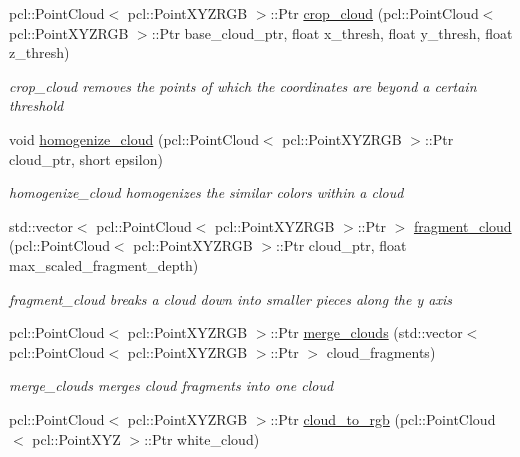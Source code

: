 \begin{DoxyCompactItemize}
pcl\+::\+Point\+Cloud$<$ pcl\+::\+Point\+X\+Y\+Z\+R\+GB $>$\+::Ptr \hyperlink{namespacecloud__object__segmentation_1_1cloud__manip_ad478d5ab331172d7cee927b4512c41e3}{crop\+\_\+cloud} (pcl\+::\+Point\+Cloud$<$ pcl\+::\+Point\+X\+Y\+Z\+R\+GB $>$\+::Ptr base\+\_\+cloud\+\_\+ptr, float x\+\_\+thresh, float y\+\_\+thresh, float z\+\_\+thresh)
\begin{DoxyCompactList}\small\item\em crop\+\_\+cloud removes the points of which the coordinates are beyond a certain threshold \end{DoxyCompactList}\item 
void \hyperlink{namespacecloud__object__segmentation_1_1cloud__manip_a27a363b92fc0623771f616e63355f53e}{homogenize\+\_\+cloud} (pcl\+::\+Point\+Cloud$<$ pcl\+::\+Point\+X\+Y\+Z\+R\+GB $>$\+::Ptr cloud\+\_\+ptr, short epsilon)
\begin{DoxyCompactList}\small\item\em homogenize\+\_\+cloud homogenizes the similar colors within a cloud \end{DoxyCompactList}\item 
std\+::vector$<$ pcl\+::\+Point\+Cloud$<$ pcl\+::\+Point\+X\+Y\+Z\+R\+GB $>$\+::Ptr $>$ \hyperlink{namespacecloud__object__segmentation_1_1cloud__manip_ad66f43b7fb1e5512f948ad68fa1a62aa}{fragment\+\_\+cloud} (pcl\+::\+Point\+Cloud$<$ pcl\+::\+Point\+X\+Y\+Z\+R\+GB $>$\+::Ptr cloud\+\_\+ptr, float max\+\_\+scaled\+\_\+fragment\+\_\+depth)
\begin{DoxyCompactList}\small\item\em fragment\+\_\+cloud breaks a cloud down into smaller pieces along the y axis \end{DoxyCompactList}\item 
pcl\+::\+Point\+Cloud$<$ pcl\+::\+Point\+X\+Y\+Z\+R\+GB $>$\+::Ptr \hyperlink{namespacecloud__object__segmentation_1_1cloud__manip_a511ee636ce50f2dc7a171fd02177034d}{merge\+\_\+clouds} (std\+::vector$<$ pcl\+::\+Point\+Cloud$<$ pcl\+::\+Point\+X\+Y\+Z\+R\+GB $>$\+::Ptr $>$ cloud\+\_\+fragments)
\begin{DoxyCompactList}\small\item\em merge\+\_\+clouds merges cloud fragments into one cloud \end{DoxyCompactList}\item 
pcl\+::\+Point\+Cloud$<$ pcl\+::\+Point\+X\+Y\+Z\+R\+GB $>$\+::Ptr \hyperlink{namespacecloud__object__segmentation_1_1cloud__manip_a60479bf28af2ec5244f6652973cde988}{cloud\+\_\+to\+\_\+rgb} (pcl\+::\+Point\+Cloud$<$ pcl\+::\+Point\+X\+YZ $>$\+::Ptr white\+\_\+cloud)

\end{DoxyCompactItemize}
